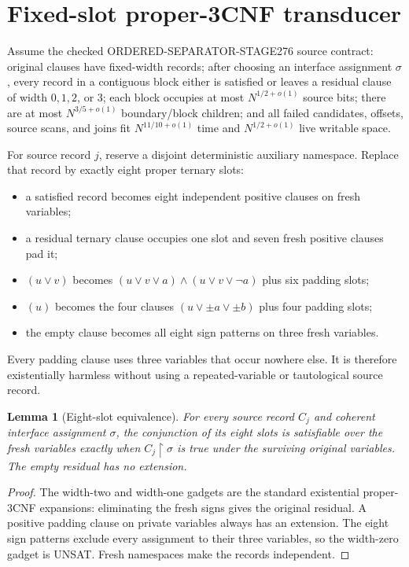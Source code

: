 \documentclass[11pt]{article}
\newtheorem{lemma}[theorem]{Lemma}
\begin{document}
\section{Fixed-slot proper-3CNF transducer}
Assume the checked ORDERED-SEPARATOR-STAGE276 source contract: original clauses have fixed-width records; after choosing an interface assignment $\sigma$, every record in a contiguous block either is satisfied or leaves a residual clause of width $0,1,2$, or $3$; each block occupies at most $N^{1/2+o(1)}$ source bits; there are at most $N^{3/5+o(1)}$ boundary/block children; and all failed candidates, offsets, source scans, and joins fit $N^{11/10+o(1)}$ time and $N^{1/2+o(1)}$ live writable space.

For source record $j$, reserve a disjoint deterministic auxiliary namespace.  Replace that record by exactly eight proper ternary slots:
\begin{itemize}
\item a satisfied record becomes eight independent positive clauses on fresh variables;
\item a residual ternary clause occupies one slot and seven fresh positive clauses pad it;
\item $(u\vee v)$ becomes $(u\vee v\vee a)\wedge(u\vee v\vee\neg a)$ plus six padding slots;
\item $(u)$ becomes the four clauses $(u\vee\pm a\vee\pm b)$ plus four padding slots;
\item the empty clause becomes all eight sign patterns on three fresh variables.
\end{itemize}
Every padding clause uses three variables that occur nowhere else.  It is therefore existentially harmless without using a repeated-variable or tautological source record.

\begin{lemma}[Eight-slot equivalence]\label{lem:slot}
For every source record $C_j$ and coherent interface assignment $\sigma$, the conjunction of its eight slots is satisfiable over the fresh variables exactly when $C_j\upharpoonright\sigma$ is true under the surviving original variables.  The empty residual has no extension.
\end{lemma}
\begin{proof}
The width-two and width-one gadgets are the standard existential proper-3CNF expansions: eliminating the fresh signs gives the original residual.  A positive padding clause on private variables always has an extension.  The eight sign patterns exclude every assignment to their three variables, so the width-zero gadget is UNSAT.  Fresh namespaces make the records independent.\end{proof}
\end{document}
